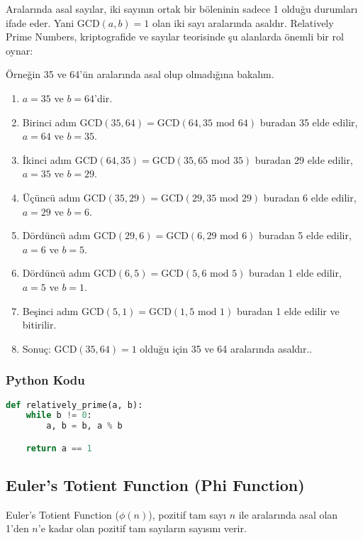 Aralarında asal sayılar, iki sayının ortak bir böleninin sadece 1 olduğu durumları ifade eder. Yani $\text{GCD}(a, b) = 1$ olan iki sayı aralarında asaldır. Relatively Prime Numbers, kriptografide ve sayılar teorisinde şu alanlarda önemli bir rol oynar:

Örneğin 35 ve 64'ün aralarında asal olup olmadığına bakalım.

\begin{enumerate}
    \item $a = 35$ ve $b = 64$'dir.
    \item Birinci adım $\text{GCD}(35, 64) = \text{GCD}(64, 35 \text{ mod } 64)$ buradan 35 elde edilir, $a = 64$ ve $b = 35$.
    \item İkinci adım $\text{GCD}(64, 35) = \text{GCD}(35, 65 \text{ mod } 35)$ buradan 29 elde edilir, $a = 35$ ve $b = 29$.
    \item Üçüncü adım $\text{GCD}(35, 29) = \text{GCD}(29, 35 \text{ mod } 29)$ buradan 6 elde edilir, $a = 29$ ve $b = 6$.
    \item Dördüncü adım $\text{GCD}(29, 6) = \text{GCD}(6, 29 \text{ mod } 6)$ buradan 5 elde edilir, $a = 6$ ve $b = 5$.
    \item Dördüncü adım $\text{GCD}(6, 5) = \text{GCD}(5, 6 \text{ mod } 5)$ buradan 1 elde edilir, $a = 5$ ve $b = 1$.
    \item Beşinci adım $\text{GCD}(5, 1) = \text{GCD}(1, 5 \text{ mod } 1)$ buradan 1 elde edilir ve bitirilir.
    \item Sonuç: $\text{GCD}(35, 64) = 1$ olduğu için 35 ve 64 aralarında asaldır..
\end{enumerate}

\subsubsection{Python Kodu}

\begin{lstlisting}[language=Python]
def relatively_prime(a, b):
    while b != 0:
        a, b = b, a % b

    return a == 1
\end{lstlisting}

\newpage

\subsection{Euler's Totient Function (Phi Function)}

Euler's Totient Function ($\phi(n)$), pozitif tam sayı $n$ ile aralarında asal olan 1'den $n$'e kadar olan pozitif tam sayıların sayısını verir. 

